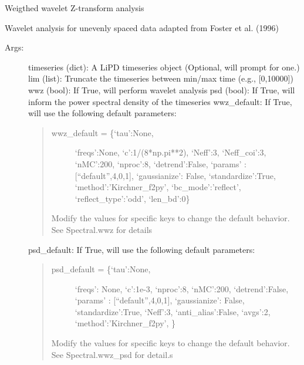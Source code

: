 \documentclass[letterpaper,10pt,english]{sphinxmanual}
\begin{document}
\begin{fulllineitems}
\label{\detokenize{Main:pyleoclim.wwzTs}}
Weigthed wavelet Z-transform analysis

Wavelet analysis for unevenly spaced data adapted from Foster et al. (1996)
\begin{description}
\item[{Args:}] \leavevmode
timeseries (dict): A LiPD timeseries object (Optional, will prompt for one.)
lim (list): Truncate the timeseries between min/max time (e.g., {[}0,10000{]})
wwz (bool): If True, will perform wavelet analysis
psd (bool): If True, will inform the power spectral density of the timeseries
wwz\_default: If True, will use the following default parameters:
\begin{quote}
\begin{description}
\item[{wwz\_default = \{‘tau’:None,}] \leavevmode
‘freqs’:None,
‘c’:1/(8*np.pi**2),
‘Neff’:3,
‘Neff\_coi’:3,
‘nMC’:200,
‘nproc’:8,
‘detrend’:False,
‘params’ : {[}“default”,4,0,1{]},
‘gaussianize’: False,
‘standardize’:True,
‘method’:’Kirchner\_f2py’,
‘bc\_mode’:’reflect’,
‘reflect\_type’:’odd’,
‘len\_bd’:0\}

\end{description}

Modify the values for specific keys to change the default behavior.
See Spectral.wwz for details
\end{quote}

psd\_default: If True, will use the following default parameters:
\begin{quote}
\begin{description}
\item[{psd\_default = \{‘tau’:None,}] \leavevmode
‘freqs’: None,
‘c’:1e-3,
‘nproc’:8,
‘nMC’:200,
‘detrend’:False,
‘params’ : {[}“default”,4,0,1{]},
‘gaussianize’: False,
‘standardize’:True,
‘Neff’:3,
‘anti\_alias’:False,
‘avgs’:2,
‘method’:’Kirchner\_f2py’,
\}

\end{description}

Modify the values for specific keys to change the default behavior.
See Spectral.wwz\_psd for detail.s
\end{quote}


\end{description}
\end{fulllineitems}
\end{document}
